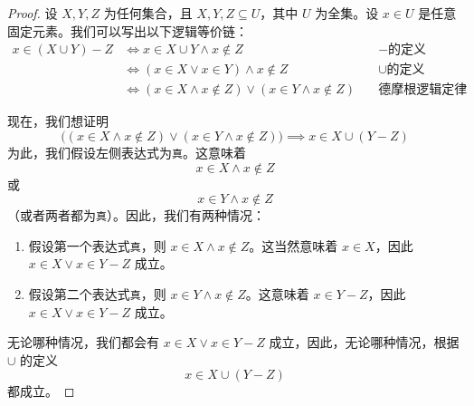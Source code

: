 \begin{proof}
    设 $X,Y,Z$ 为任何集合，且 $X,Y,Z \subseteq U$，其中 $U$ 为全集。设 $x \in U$ 是任意固定元素。我们可以写出以下逻辑等价链：
    \begin{align*}
        x \in (X \cup Y ) - Z &\iff x \in X \cup Y \land x \notin Z &\quad - \text{的定义}\\
        &\iff (x \in X \lor x \in Y ) \land x \notin Z &\quad \cup \text{的定义} \\
        &\iff (x \in X \land x \notin Z) \lor (x \in Y \land x \notin Z) &\quad \text{德摩根逻辑定律} 
    \end{align*}
    
    \setlength{\fboxrule}{2pt}
    \setlength\fboxsep{5mm}
    \begin{center}
    \end{center}
    现在，我们想证明
    \[\big((x \in X \land x \notin Z) \lor (x \in Y \land x \notin Z)\big) \implies x \in X \cup (Y - Z)\]
    为此，我们假设左侧表达式为\verb|真|。这意味着
    \[x \in X \land x \notin Z\]
    或
    \[x \in Y \land x \notin Z\]
    （或者两者都为\verb|真|）。因此，我们有两种情况：
    \begin{enumerate}
        \item 假设第一个表达式\verb|真|，则 $x \in X \land x \notin Z$。这当然意味着 $x \in X$，因此 $x \in X \lor x \in Y - Z$ 成立。
        \item 假设第二个表达式\verb|真|，则 $x \in Y \land x \notin Z$。这意味着 $x \in Y - Z$，因此 $x \in X \lor x ∈ Y - Z$ 成立。
    \end{enumerate}
    无论哪种情况，我们都会有 $x \in X \lor x \in Y - Z$ 成立，因此，无论哪种情况，根据 $\cup$ 的定义
    \[x \in X \cup (Y - Z)\]
    都成立。


\end{proof}
